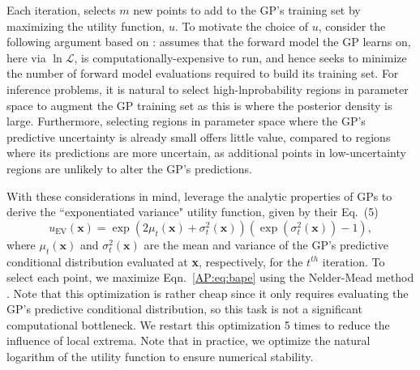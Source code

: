 Each iteration, \approxposterior selects $m$ new points to add to the GP's training set by maximizing the utility function, $u$. To motivate the choice of $u$, consider the following argument based on \citet{Kandasamy2017}: \approxposterior assumes that the forward model the GP learns on, here \vplanet via $\ln \mathcal{L}$, is computationally-expensive to run, and hence \approxposterior seeks to minimize the number of forward model evaluations required to build its training set. For inference problems, it is natural to select high-lnprobability regions in parameter space to augment the GP training set as this is where the posterior density is large. Furthermore, selecting regions in parameter space where the GP's predictive uncertainty is already small offers little value, compared to regions where its predictions are more uncertain, as additional points in low-uncertainty regions are unlikely to alter the GP's predictions. 

With these considerations in mind, \citet{Kandasamy2017} leverage the analytic properties of GPs to derive the ``exponentiated variance" utility function, given by their Eq.~(5)
\begin{equation} \label{AP:eq:bape}
    u_{\textrm{EV}}(\textbf{x}) = \exp(2 \mu_t(\textbf{x}) + \sigma_t^2(\textbf{x}))(\exp(\sigma_t^2(\textbf{x})) - 1),
\end{equation}
where $\mu_t(\textbf{x})$ and $\sigma_t^2(\textbf{x})$ are the mean and variance of the GP's predictive conditional distribution evaluated at \textbf{x}, respectively, for the $t^{th}$ \approxposterior iteration. To select each point, we maximize Eqn.~\ref{AP:eq:bape} using the Nelder-Mead method \citep{Nelder1965}. Note that this optimization is rather cheap since it only requires evaluating the GP's predictive conditional distribution, so this task is not a significant computational bottleneck. We restart this optimization 5 times to reduce the influence of local extrema. Note that in practice, we optimize the natural logarithm of the utility function to ensure numerical stability.

